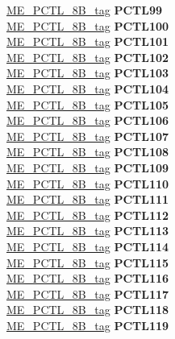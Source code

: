 \begin{DoxyCompactItemize}
\begin{tabbing}
\>\>\mbox{\hyperlink{unionME__PCTL__8B__tag}{ME\_PCTL\_8B\_tag}} {\bfseries PCTL99}\\
\>\>\mbox{\hyperlink{unionME__PCTL__8B__tag}{ME\_PCTL\_8B\_tag}} {\bfseries PCTL100}\\
\>\>\mbox{\hyperlink{unionME__PCTL__8B__tag}{ME\_PCTL\_8B\_tag}} {\bfseries PCTL101}\\
\>\>\mbox{\hyperlink{unionME__PCTL__8B__tag}{ME\_PCTL\_8B\_tag}} {\bfseries PCTL102}\\
\>\>\mbox{\hyperlink{unionME__PCTL__8B__tag}{ME\_PCTL\_8B\_tag}} {\bfseries PCTL103}\\
\>\>\mbox{\hyperlink{unionME__PCTL__8B__tag}{ME\_PCTL\_8B\_tag}} {\bfseries PCTL104}\\
\>\>\mbox{\hyperlink{unionME__PCTL__8B__tag}{ME\_PCTL\_8B\_tag}} {\bfseries PCTL105}\\
\>\>\mbox{\hyperlink{unionME__PCTL__8B__tag}{ME\_PCTL\_8B\_tag}} {\bfseries PCTL106}\\
\>\>\mbox{\hyperlink{unionME__PCTL__8B__tag}{ME\_PCTL\_8B\_tag}} {\bfseries PCTL107}\\
\>\>\mbox{\hyperlink{unionME__PCTL__8B__tag}{ME\_PCTL\_8B\_tag}} {\bfseries PCTL108}\\
\>\>\mbox{\hyperlink{unionME__PCTL__8B__tag}{ME\_PCTL\_8B\_tag}} {\bfseries PCTL109}\\
\>\>\mbox{\hyperlink{unionME__PCTL__8B__tag}{ME\_PCTL\_8B\_tag}} {\bfseries PCTL110}\\
\>\>\mbox{\hyperlink{unionME__PCTL__8B__tag}{ME\_PCTL\_8B\_tag}} {\bfseries PCTL111}\\
\>\>\mbox{\hyperlink{unionME__PCTL__8B__tag}{ME\_PCTL\_8B\_tag}} {\bfseries PCTL112}\\
\>\>\mbox{\hyperlink{unionME__PCTL__8B__tag}{ME\_PCTL\_8B\_tag}} {\bfseries PCTL113}\\
\>\>\mbox{\hyperlink{unionME__PCTL__8B__tag}{ME\_PCTL\_8B\_tag}} {\bfseries PCTL114}\\
\>\>\mbox{\hyperlink{unionME__PCTL__8B__tag}{ME\_PCTL\_8B\_tag}} {\bfseries PCTL115}\\
\>\>\mbox{\hyperlink{unionME__PCTL__8B__tag}{ME\_PCTL\_8B\_tag}} {\bfseries PCTL116}\\
\>\>\mbox{\hyperlink{unionME__PCTL__8B__tag}{ME\_PCTL\_8B\_tag}} {\bfseries PCTL117}\\
\>\>\mbox{\hyperlink{unionME__PCTL__8B__tag}{ME\_PCTL\_8B\_tag}} {\bfseries PCTL118}\\
\>\>\mbox{\hyperlink{unionME__PCTL__8B__tag}{ME\_PCTL\_8B\_tag}} {\bfseries PCTL119}\\

\end{tabbing}
\end{DoxyCompactItemize}
